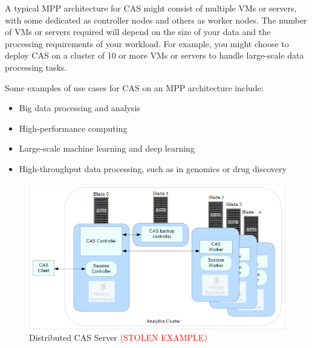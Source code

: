 A typical MPP architecture for CAS might consist of multiple VMs or servers, with some dedicated as controller nodes and others as worker nodes. The number of VMs or servers required will depend on the size of your data and the processing requirements of your workload. For example, you might choose to deploy CAS on a cluster of 10 or more VMs or servers to handle large-scale data processing tasks.

Some examples of use cases for CAS on an MPP architecture include:
\begin{itemize}
    \item Big data processing and analysis
    \item High-performance computing
    \item Large-scale machine learning and deep learning
    \item High-throughput data processing, such as in genomics or drug discovery
\end{itemize}

\begin{figure}[H]
    \centering
    \includegraphics[scale = 0.70]{images/mpp_server.png}
    \caption{Distributed CAS Server \textcolor{red}{(STOLEN EXAMPLE)} }
    \label{MMP Architecture}
\end{figure}

